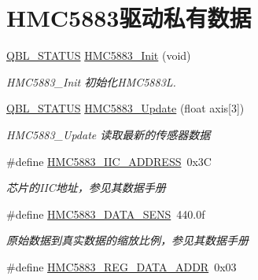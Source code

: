\hypertarget{group__hmc5883__driver__private}{}\section{H\+M\+C5883驱动私有数据}
\label{group__hmc5883__driver__private}
\begin{DoxyCompactItemize}
\item 
\hyperlink{group__qbl_ga41526b685f55486191108499fe91c30b}{Q\+B\+L\+\_\+\+S\+T\+A\+T\+US} \hyperlink{group__hmc5883__driver__private_ga23d45753863d03d2e20ad4175965cb75}{H\+M\+C5883\+\_\+\+Init} (void)
\begin{DoxyCompactList}\small\item\em H\+M\+C5883\+\_\+\+Init 初始化\+H\+M\+C5883L. \end{DoxyCompactList}\item 
\hyperlink{group__qbl_ga41526b685f55486191108499fe91c30b}{Q\+B\+L\+\_\+\+S\+T\+A\+T\+US} \hyperlink{group__hmc5883__driver__private_gab380fb39719ca6cd76c4277cd0a8e1c8}{H\+M\+C5883\+\_\+\+Update} (float axis\mbox{[}3\mbox{]})
\begin{DoxyCompactList}\small\item\em H\+M\+C5883\+\_\+\+Update 读取最新的传感器数据 \end{DoxyCompactList}\item 
\#define \hyperlink{group__hmc5883__driver__private_ga6887196e8734d548ab7410e96ef5aed4}{H\+M\+C5883\+\_\+\+I\+I\+C\+\_\+\+A\+D\+D\+R\+E\+SS}~0x3C\hypertarget{group__hmc5883__driver__private_ga6887196e8734d548ab7410e96ef5aed4}{}\label{group__hmc5883__driver__private_ga6887196e8734d548ab7410e96ef5aed4}

\begin{DoxyCompactList}\small\item\em 芯片的\+I\+I\+C地址，参见其数据手册 \end{DoxyCompactList}\item 
\#define \hyperlink{group__hmc5883__driver__private_ga9c9589bb19e67395e4148d33fcb160e6}{H\+M\+C5883\+\_\+\+D\+A\+T\+A\+\_\+\+S\+E\+NS}~440.\+0f\hypertarget{group__hmc5883__driver__private_ga9c9589bb19e67395e4148d33fcb160e6}{}\label{group__hmc5883__driver__private_ga9c9589bb19e67395e4148d33fcb160e6}

\begin{DoxyCompactList}\small\item\em 原始数据到真实数据的缩放比例，参见其数据手册 \end{DoxyCompactList}\item 
\#define \hyperlink{group__hmc5883__driver__private_ga5af6f3e1f8cb12a7d074b60f6653ee24}{H\+M\+C5883\+\_\+\+R\+E\+G\+\_\+\+D\+A\+T\+A\+\_\+\+A\+D\+DR}~0x03\hypertarget{group__hmc5883__driver__private_ga5af6f3e1f8cb12a7d074b60f6653ee24}{}\label{group__hmc5883__driver__private_ga5af6f3e1f8cb12a7d074b60f6653ee24}


\end{DoxyCompactItemize}
